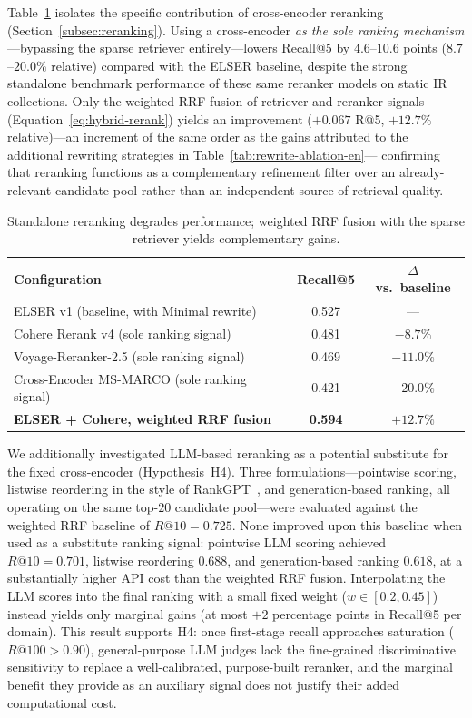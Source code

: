 Table~\ref{tab:reranking-alone-en} isolates the specific contribution of cross-encoder reranking (Section~\ref{subsec:reranking}). Using a cross-encoder \emph{as the sole ranking mechanism}---bypassing the sparse retriever entirely---lowers Recall@5 by $4.6$--$10.6$ points ($8.7$--$20.0\%$ relative) compared with the ELSER baseline, despite the strong standalone benchmark performance of these same reranker models on static IR collections. Only the weighted RRF fusion of retriever and reranker signals (Equation~\eqref{eq:hybrid-rerank}) yields an improvement ($+0.067$ R@5, $+12.7\%$ relative)---an increment of the same order as the gains attributed to the additional rewriting strategies in Table~\ref{tab:rewrite-ablation-en}--- confirming that reranking functions as a complementary refinement filter over an already-relevant candidate pool rather than an independent source of retrieval quality.

\begin{table}[h]
\centering
\small
\begin{tabular}{lcc}
\toprule
\textbf{Configuration} & \textbf{Recall@5} & \textbf{$\Delta$ vs.\ baseline} \\
\midrule
ELSER v1 (baseline, with Minimal rewrite) & 0.527 & --- \\
Cohere Rerank v4 (sole ranking signal) & 0.481 & $-8.7\%$ \\
Voyage-Reranker-2.5 (sole ranking signal) & 0.469 & $-11.0\%$ \\
Cross-Encoder MS-MARCO (sole ranking signal) & 0.421 & $-20.0\%$ \\
\textbf{ELSER + Cohere, weighted RRF fusion} & \textbf{0.594} & \textbf{$+12.7\%$} \\
\bottomrule
\end{tabular}
\caption{Standalone reranking degrades performance; weighted RRF fusion with the sparse retriever yields complementary gains.}
\label{tab:reranking-alone-en}
\end{table}

We additionally investigated LLM-based reranking as a potential substitute for the fixed cross-encoder (Hypothesis~H4). Three formulations---pointwise scoring, listwise reordering in the style of RankGPT~\citep{sun2023rankgpt}, and generation-based ranking, all operating on the same top-$20$ candidate pool---were evaluated against the weighted RRF baseline of $R@10{=}0.725$. None improved upon this baseline when used as a substitute ranking signal: pointwise LLM scoring achieved $R@10{=}0.701$, listwise reordering $0.688$, and generation-based ranking $0.618$, at a substantially higher API cost than the weighted RRF fusion. Interpolating the LLM scores into the final ranking with a small fixed weight ($w \in [0.2, 0.45]$) instead yields only marginal gains (at most $+2$ percentage points in Recall@5 per domain). This result supports H4: once first-stage recall approaches saturation ($R@100 > 0.90$), general-purpose LLM judges lack the fine-grained discriminative sensitivity to replace a well-calibrated, purpose-built reranker, and the marginal benefit they provide as an auxiliary signal does not justify their added computational cost.

